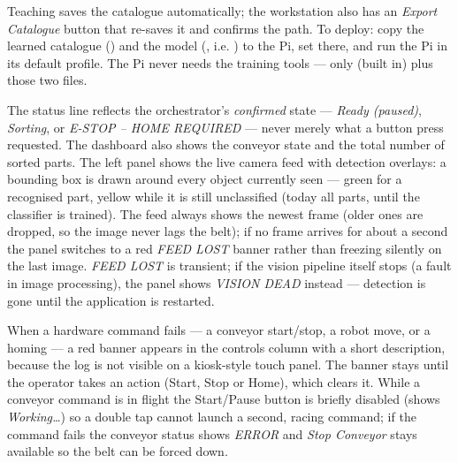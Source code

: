Teaching saves the catalogue automatically; the workstation also has an
\emph{Export Catalogue} button that re-saves it and confirms the path. To
deploy: copy the learned catalogue () and the
model (, i.e. ) to the
Pi, set  there, and run the Pi in its default
 profile. The Pi never needs the training tools --- only 
(built in) plus those two files.

The status line reflects the orchestrator's \emph{confirmed} state —
\emph{Ready (paused)}, \emph{Sorting}, or \emph{E-STOP -- HOME REQUIRED}
— never merely what a button press requested. The dashboard also shows
the conveyor state and the total number of sorted parts. The left panel
shows the live camera feed with detection overlays: a bounding box is drawn
around every object currently seen --- green for a recognised part, yellow
while it is still unclassified (today all parts, until the classifier is
trained). The feed always shows the newest frame (older ones are dropped, so
the image never lags the belt); if no frame arrives for about a second the
panel switches to a red \emph{FEED LOST} banner rather than freezing
silently on the last image. \emph{FEED LOST} is transient; if the vision
pipeline itself stops (a fault in image processing), the panel shows
\emph{VISION DEAD} instead --- detection is gone until the application is
restarted.

When a hardware command fails --- a conveyor start/stop, a robot move, or
a homing --- a red banner appears in the controls column with a short
description, because the log is not visible on a kiosk-style touch panel.
The banner stays until the operator takes an action (Start, Stop or Home),
which clears it. While a conveyor command is in flight the Start/Pause
button is briefly disabled (shows \emph{Working\ldots}) so a double tap
cannot launch a second, racing command; if the command fails the conveyor
status shows \emph{ERROR} and \emph{Stop Conveyor} stays available so the
belt can be forced down.

